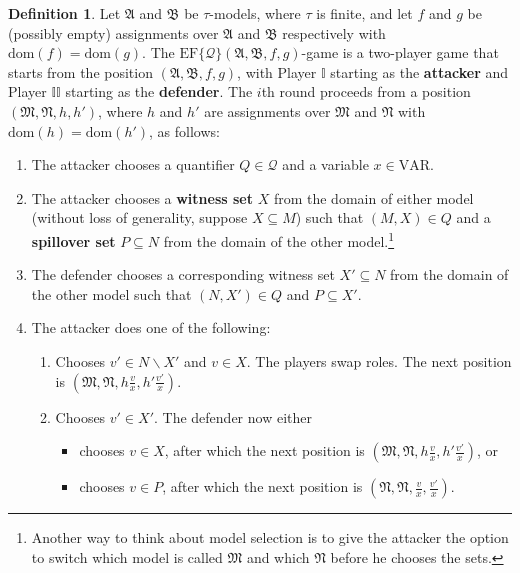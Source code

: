 \documentclass{article}
\theoremstyle{definition}
\newtheorem{definition}[theorem]{Definition}
\begin{document}
\begin{definition}
    Let $\mathfrak{A}$ and $\mathfrak{B}$ be $\tau$-models, where $\tau$ is finite, and let $f$ and $g$ be (possibly empty) assignments over $\mathfrak{A}$ and $\mathfrak{B}$ respectively with $\mathrm{dom}(f)=\mathrm{dom}(g)$. The $\mathrm{EF}\{\mathcal{Q}\}(\mathfrak{A},\mathfrak{B},f,g)$-game is a two-player game that starts from the position $(\mathfrak{A},\mathfrak{B},f,g)$, with Player $\mathbb{I}$ starting as the \textbf{attacker} and Player $\mathbb{II}$ starting as the \textbf{defender}. The $i$th round proceeds from a position $(\mathfrak{M},\mathfrak{N},h,h')$, where $h$ and $h'$ are assignments over $\mathfrak{M}$ and $\mathfrak{N}$ with $\mathrm{dom}(h)=\mathrm{dom}(h')$, as follows:
    \begin{enumerate}
        \item The attacker chooses a quantifier $Q\in \mathcal{Q}$ and a variable $x\in\mathrm{VAR}$.
        \item The attacker chooses a \textbf{witness set} $X$ from the domain of either model (without loss of generality, suppose $X\subseteq M$) such that $(M,X)\in Q$ and a \textbf{spillover set} $P\subseteq N$ from the domain of the other model.\footnote{Another way to think about model selection is to give the attacker the option to switch which model is called $\mathfrak{M}$ and which $\mathfrak{N}$ before he chooses the sets.}
        \item The defender chooses a corresponding witness set $X'\subseteq N$ from the domain of the other model such that $(N,X')\in Q$ and $P\subseteq X'$.
        \item The attacker does one of the following:
        \begin{enumerate}
            \item Chooses $v'\in N\backslash X'$ and $v\in X$. The players swap roles. The next position is         $(\mathfrak{M},\mathfrak{N},h\frac{v}{x},h'\frac{v'}{x})$.
            \item Chooses $v'\in X'$. The defender now either
            \begin{itemize}
                \item chooses $v\in X$, after which the next position is             $(\mathfrak{M},\mathfrak{N},h\frac{v}{x},h'\frac{v'}{x})$, or
                \item chooses $v\in P$, after which the next position is             $(\mathfrak{N},\mathfrak{N},\frac{v}{x},\frac{v'}{x})$.
            \end{itemize}

\end{enumerate}
\end{enumerate}
\end{definition}
\end{document}
